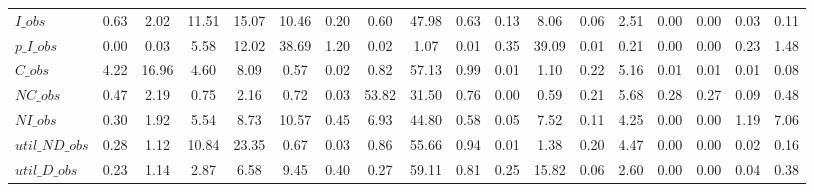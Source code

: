 \begin{center}
\begin{longtable}{lccccccccccccccccc}
$I\_obs         $	 & 	            0.63	 & 	            2.02	 & 	           11.51	 & 	           15.07	 & 	           10.46	 & 	            0.20	 & 	            0.60	 & 	           47.98	 & 	            0.63	 & 	            0.13	 & 	            8.06	 & 	            0.06	 & 	            2.51	 & 	            0.00	 & 	            0.00	 & 	            0.03	 & 	            0.11 \\ 
$p\_I\_obs      $	 & 	            0.00	 & 	            0.03	 & 	            5.58	 & 	           12.02	 & 	           38.69	 & 	            1.20	 & 	            0.02	 & 	            1.07	 & 	            0.01	 & 	            0.35	 & 	           39.09	 & 	            0.01	 & 	            0.21	 & 	            0.00	 & 	            0.00	 & 	            0.23	 & 	            1.48 \\ 
$C\_obs         $	 & 	            4.22	 & 	           16.96	 & 	            4.60	 & 	            8.09	 & 	            0.57	 & 	            0.02	 & 	            0.82	 & 	           57.13	 & 	            0.99	 & 	            0.01	 & 	            1.10	 & 	            0.22	 & 	            5.16	 & 	            0.01	 & 	            0.01	 & 	            0.01	 & 	            0.08 \\ 
$NC\_obs        $	 & 	            0.47	 & 	            2.19	 & 	            0.75	 & 	            2.16	 & 	            0.72	 & 	            0.03	 & 	           53.82	 & 	           31.50	 & 	            0.76	 & 	            0.00	 & 	            0.59	 & 	            0.21	 & 	            5.68	 & 	            0.28	 & 	            0.27	 & 	            0.09	 & 	            0.48 \\ 
$NI\_obs        $	 & 	            0.30	 & 	            1.92	 & 	            5.54	 & 	            8.73	 & 	           10.57	 & 	            0.45	 & 	            6.93	 & 	           44.80	 & 	            0.58	 & 	            0.05	 & 	            7.52	 & 	            0.11	 & 	            4.25	 & 	            0.00	 & 	            0.00	 & 	            1.19	 & 	            7.06 \\ 
$util\_ND\_obs  $	 & 	            0.28	 & 	            1.12	 & 	           10.84	 & 	           23.35	 & 	            0.67	 & 	            0.03	 & 	            0.86	 & 	           55.66	 & 	            0.94	 & 	            0.01	 & 	            1.38	 & 	            0.20	 & 	            4.47	 & 	            0.00	 & 	            0.00	 & 	            0.02	 & 	            0.16 \\ 
$util\_D\_obs   $	 & 	            0.23	 & 	            1.14	 & 	            2.87	 & 	            6.58	 & 	            9.45	 & 	            0.40	 & 	            0.27	 & 	           59.11	 & 	            0.81	 & 	            0.25	 & 	           15.82	 & 	            0.06	 & 	            2.60	 & 	            0.00	 & 	            0.00	 & 	            0.04	 & 	            0.38 \\ 

\end{longtable}
\end{center}
